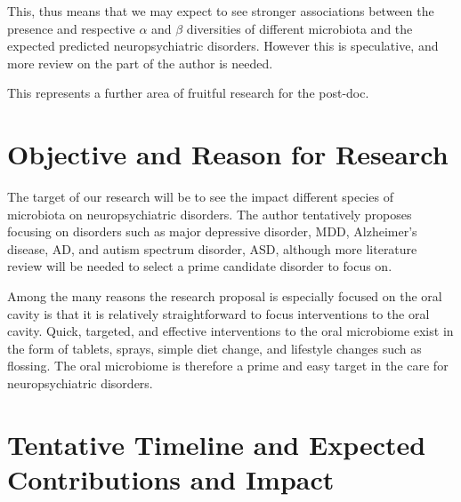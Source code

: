 \documentclass{article}
\begin{document}
\begin{multicols}{2}
 This, thus means that we may expect to see stronger associations between the presence and respective $\alpha$ and $\beta$ diversities of different microbiota and the expected predicted neuropsychiatric disorders. However this is speculative, and more review on the part of the author is needed.
 
 This represents a further area of fruitful research for the post-doc.
\section{Objective and Reason for Research}
The target of our research will be to see the impact different species of microbiota on neuropsychiatric disorders. The author tentatively proposes focusing on disorders such as major depressive disorder, MDD, Alzheimer's disease, AD, and autism spectrum disorder, ASD, although more literature review will be needed to select a prime candidate disorder to focus on.

Among the many reasons the research proposal is especially focused on the oral cavity is that it is relatively straightforward to focus interventions to the oral cavity. Quick, targeted, and effective interventions to the oral microbiome exist in the form of tablets, sprays, simple diet change, and lifestyle changes such as flossing. The oral microbiome is therefore a prime and easy target in the care for neuropsychiatric disorders. 
\section{Tentative Timeline and Expected Contributions and Impact}



\end{multicols}
\end{document}
